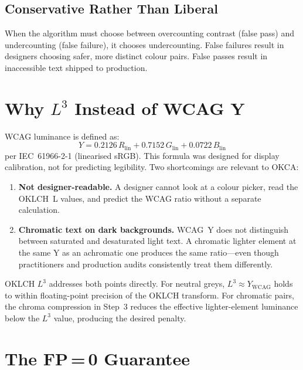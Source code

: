 \documentclass[11pt,a4paper]{article}
\begin{document}
\subsection{Conservative Rather Than Liberal}

When the algorithm must choose between overcounting contrast (false pass)
and undercounting (false failure), it chooses undercounting.  False
failures result in designers choosing safer, more distinct colour pairs.
False passes result in inaccessible text shipped to production.

\section{\texorpdfstring{Why $L^3$ Instead of WCAG Y}{Why L³ Instead of WCAG Y}}
\label{sec:l3}

WCAG luminance is defined as:
\[
  Y = 0.2126\,R_{\text{lin}} + 0.7152\,G_{\text{lin}} + 0.0722\,B_{\text{lin}}
\]
per IEC~61966-2-1 (linearised sRGB).  This formula was designed for
display calibration, not for predicting legibility.  Two shortcomings
are relevant to OKCA:

\begin{enumerate}
  \item \textbf{Not designer-readable.}  A designer cannot look at a
    colour picker, read the OKLCH~L values, and predict the WCAG ratio
    without a separate calculation.

  \item \textbf{Chromatic text on dark backgrounds.}  WCAG~Y does not
    distinguish between saturated and desaturated light text.  A
    chromatic lighter element at the same Y as an achromatic one produces
    the same ratio---even though practitioners and production audits
    consistently treat them differently.
\end{enumerate}

OKLCH $L^3$ addresses both points directly.  For neutral greys,
$L^3 \approx Y_{\text{WCAG}}$ holds to within floating-point precision
of the OKLCH transform.  For chromatic pairs, the chroma compression in
Step~3 reduces the effective lighter-element luminance below the $L^3$
value, producing the desired penalty.

\section{\texorpdfstring{The FP\,=\,0 Guarantee}{The FP = 0 Guarantee}}
\label{sec:fp0}
\end{document}

